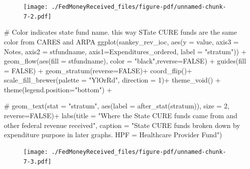 \documentclass[
  letterpaper,
  DIV=11,
  numbers=noendperiod]{scrreport}
\newenvironment{Shaded}{\begin{snugshade}}{\end{snugshade}}
\newcommand{\AttributeTok}[1]{\textcolor[rgb]{0.40,0.45,0.13}{#1}}
\newcommand{\CommentTok}[1]{\textcolor[rgb]{0.37,0.37,0.37}{#1}}
\newcommand{\ConstantTok}[1]{\textcolor[rgb]{0.56,0.35,0.01}{#1}}
\newcommand{\DecValTok}[1]{\textcolor[rgb]{0.68,0.00,0.00}{#1}}
\newcommand{\FunctionTok}[1]{\textcolor[rgb]{0.28,0.35,0.67}{#1}}
\newcommand{\NormalTok}[1]{\textcolor[rgb]{0.00,0.23,0.31}{#1}}
\newcommand{\SpecialCharTok}[1]{\textcolor[rgb]{0.37,0.37,0.37}{#1}}
\newcommand{\StringTok}[1]{\textcolor[rgb]{0.13,0.47,0.30}{#1}}
\begin{document}
\begin{figure}[H]

{\centering \texttt{[image: ./FedMoneyReceived\_files/figure-pdf/unnamed-chunk-7-2.pdf]}

}

\end{figure}

\begin{Shaded}
\begin{Highlighting}[]
\CommentTok{\# Color indicates state fund name. this way STate CURE funds are the same color from CARES and ARPA}
\FunctionTok{ggplot}\NormalTok{(sankey\_rev\_ioc, }
       \FunctionTok{aes}\NormalTok{(}\AttributeTok{y =}\NormalTok{ value, }\AttributeTok{axis3 =}\NormalTok{ Notes, }\AttributeTok{axis2 =}\NormalTok{ stfundname, }\AttributeTok{axis1=}\NormalTok{Expenditures\_ordered, }\AttributeTok{label =} \StringTok{"stratum"}\NormalTok{)) }\SpecialCharTok{+}
  \FunctionTok{geom\_flow}\NormalTok{(}\FunctionTok{aes}\NormalTok{(}\AttributeTok{fill =}\NormalTok{ stfundname), }\AttributeTok{color =} \StringTok{"black"}\NormalTok{,}\AttributeTok{reverse=}\ConstantTok{FALSE}\NormalTok{) }\SpecialCharTok{+}
  \FunctionTok{guides}\NormalTok{(}\AttributeTok{fill =} \ConstantTok{FALSE}\NormalTok{) }\SpecialCharTok{+}   
  \FunctionTok{geom\_stratum}\NormalTok{(}\AttributeTok{reverse=}\ConstantTok{FALSE}\NormalTok{)}\SpecialCharTok{+}
\FunctionTok{coord\_flip}\NormalTok{()}\SpecialCharTok{+}
   \FunctionTok{scale\_fill\_brewer}\NormalTok{(}\AttributeTok{palette =} \StringTok{"YlOrRd"}\NormalTok{, }\AttributeTok{direction =} \DecValTok{1}\NormalTok{)}\SpecialCharTok{+}
  \FunctionTok{theme\_void}\NormalTok{() }\SpecialCharTok{+}  
  \FunctionTok{theme}\NormalTok{(}\AttributeTok{legend.position=}\StringTok{"bottom"}\NormalTok{) }\SpecialCharTok{+}

 \CommentTok{\# geom\_text(stat = "stratum", aes(label = after\_stat(stratum)), size = 2, reverse=FALSE)+}
  \FunctionTok{labs}\NormalTok{(}\AttributeTok{title =} \StringTok{"Where the State CURE funds came from and other federal revenue received"}\NormalTok{,}
       \AttributeTok{caption =} \StringTok{"State CURE funds broken down by expenditure purpose in later graphs.}
\StringTok{       HPF = Healthcare Provider Fund"}\NormalTok{)}
\end{Highlighting}
\end{Shaded}

\begin{figure}[H]

{\centering \texttt{[image: ./FedMoneyReceived\_files/figure-pdf/unnamed-chunk-7-3.pdf]}

}

\end{figure}
\end{document}
